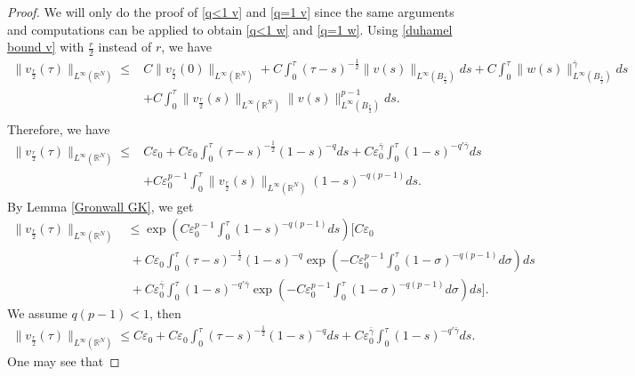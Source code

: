 \documentclass[11pt,a4paper]{article}
\newcommand{\1}{\mathbbm{1}}
\numberwithin{equation}{section}
\newcommand{\numberset}{\mathbb}
\newcommand{\R}{\numberset{R}}
\theoremstyle{remark}
\begin{document}
\begin{proof}
We will only do the proof of \eqref{q<1 v} and \eqref{q=1 v} since the same arguments and computations can be applied to obtain \eqref{q<1 w} and \eqref{q=1 w}. Using \eqref{duhamel bound v} with $\frac{r}{2}$ instead of $r$, we have
\begin{equation*}
\begin{split}
\| v_{\frac{r}{2}}(\tau)\|_{L^\infty(\R^N)}\leq& C\| v_{\frac{r}{2}}(0)\|_{L^\infty(\R^N)}+C\int^\tau_0 (\tau-s)^{-\frac{1}{2}}\|v(s)\|_{L^\infty(B_{\frac{r}{2}})}ds+C\int^\tau_0\|w(s)\|^{\bar \gamma}_{L^\infty(B_{\frac{r}{2}})}ds\\
&+ C\int^\tau_0 \|v_{\frac{r}{2}}(s)\|_{L^\infty(\R^N)}\|v(s)\|_{L^\infty(B_{\frac{r}{2}})}^{p-1}ds.\\
\end{split}
\end{equation*}
Therefore, we have
\begin{equation*}
\begin{split}
\| v_{\frac{r}{2}}(\tau)\|_{L^\infty(\R^N)} \leq& C\varepsilon_0+C\varepsilon_0\int^\tau_0 (\tau-s)^{-\frac{1}{2}}(1-s)^{-q}ds+C\varepsilon_0^{\bar \gamma}\int^\tau_0(1-s)^{-q'\bar \gamma}ds\\
&+ C \varepsilon_0^{p-1}\int^\tau_0 \|v_{\frac{r}{2}}(s)\|_{L^\infty(\R^N)}(1-s)^{-q(p-1)}ds.
\end{split}
\end{equation*}
By Lemma \ref{Gronwall GK}, we get
\begin{equation}\label{condition q}
\begin{split}
\| v_{\frac{r}{2}}(\tau)\|_{L^\infty(\R^N)}&\leq \exp\left(C \varepsilon_0^{p-1}\int^\tau_0 (1-s)^{-q(p-1)} ds\right)\bigg[C\varepsilon_0\\
&\ +C\varepsilon_0\int^\tau_0 (\tau-s)^{-\frac{1}{2}}(1-s)^{-q}\exp\left(-C \varepsilon_0^{p-1}\int^\tau_0 (1-\sigma)^{-q(p-1)} d\sigma\right)ds\\
&\ +C\varepsilon_0^{\bar \gamma}\int^\tau_0(1-s)^{-q'\bar \gamma}\exp\left(-C \varepsilon_0^{p-1}\int^\tau_0 (1-\sigma)^{-q(p-1)} d\sigma\right)ds\bigg].
\end{split}
\end{equation}
We assume $q(p-1)<1$, then
\begin{equation*}
\begin{split}
\| v_{\frac{r}{2}}(\tau)\|_{L^\infty(\R^N)}\leq C\varepsilon_0+C\varepsilon_0\int^\tau_0 (\tau-s)^{-\frac{1}{2}}(1-s)^{-q}ds+C\varepsilon_0^{\bar \gamma}\int^\tau_0(1-s)^{-q'\bar \gamma}ds.
\end{split}
\end{equation*}
One may see that


\end{proof}
\end{document}
